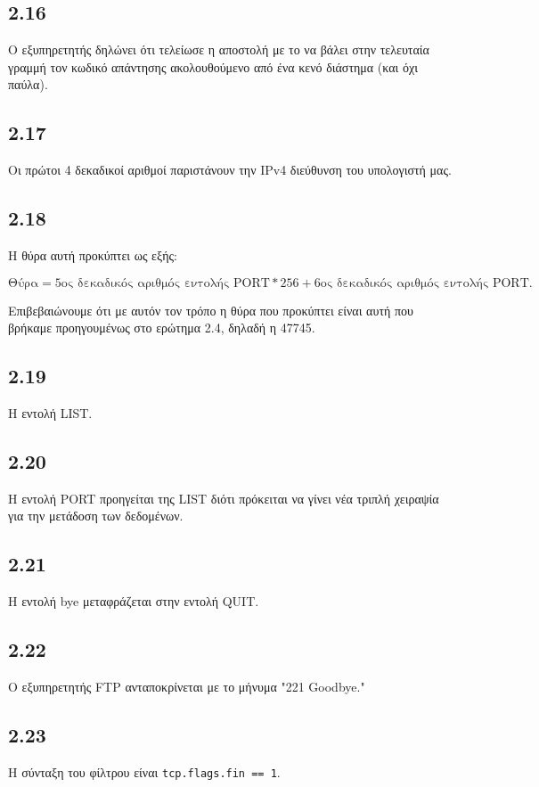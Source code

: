 		\subsection*{2.16}
			Ο εξυπηρετητής δηλώνει ότι τελείωσε η αποστολή με το να βάλει στην τελευταία γραμμή τον κωδικό απάντησης ακολουθούμενο από ένα κενό διάστημα (και όχι παύλα).
		
		\subsection*{2.17}
			Οι πρώτοι 4 δεκαδικοί αριθμοί παριστάνουν την IPv4 διεύθυνση του υπολογιστή μας.
		
		\subsection*{2.18}
			Η θύρα αυτή προκύπτει ως εξής:
			
			\[
				\text{Θύρα} = \text{5ος δεκαδικός αριθμός εντολής PORT} * 256 + \text{6ος δεκαδικός αριθμός εντολής PORT}.
			\]
			
			Επιβεβαιώνουμε ότι με αυτόν τον τρόπο η θύρα που προκύπτει είναι αυτή που βρήκαμε προηγουμένως στο ερώτημα 2.4, δηλαδή η 47745.
		
		\subsection*{2.19}
			Η εντολή LIST.
		
		\subsection*{2.20}
			Η εντολή PORT προηγείται της LIST διότι πρόκειται να γίνει νέα τριπλή χειραψία για την μετάδοση των δεδομένων.
		
		\subsection*{2.21}
			Η εντολή bye μεταφράζεται στην εντολή QUIT.
		
		\subsection*{2.22}
			Ο εξυπηρετητής FTP ανταποκρίνεται με το μήνυμα "221 Goodbye."
		
		\subsection*{2.23}
			Η σύνταξη του φίλτρου είναι \verb|tcp.flags.fin == 1|.
		
